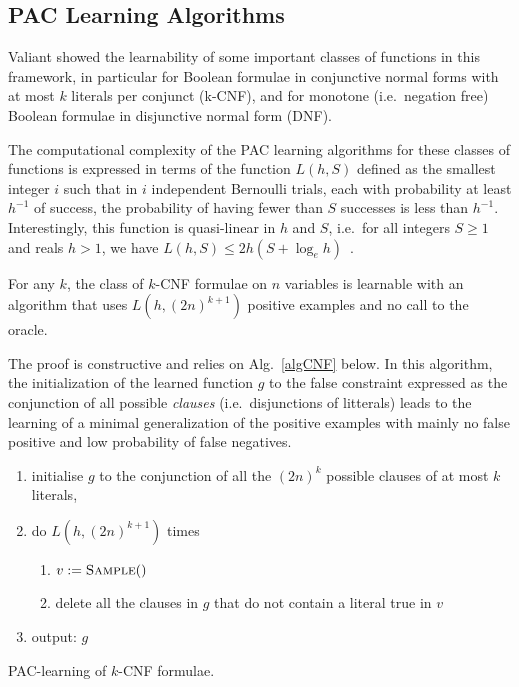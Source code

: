 \documentclass{llncs}
\begin{document}
\subsection{PAC Learning Algorithms}

Valiant showed the learnability of some important classes of functions in this framework,
in particular for Boolean formulae in conjunctive normal forms with at most $k$ literals per conjunct (k-CNF),
and for monotone (i.e.~negation free) Boolean formulae in disjunctive normal form (DNF).

The computational complexity of the PAC learning algorithms for these classes of functions is expressed in terms of the function
$L(h,S)$ defined as the smallest integer $i$ such that
in $i$ independent Bernoulli trials, each with probability at least $h^{-1}$ of success, the probability of having fewer than $S$ successes is less than $h^{-1}$.
Interestingly, this function is quasi-linear in $h$ and $S$, i.e.~for all
integers $S\ge 1$ and reals $h>1$, we have $L(h,S) \le 2h(S+\log_e h)$~\cite{Valiant84cacm}.

\begin{theorem}\label{thm:kcnf}
For any $k$, the class of $k$-CNF formulae on $n$ variables is learnable with an
algorithm that uses $L(h,{(2 n)}^{k+1})$ positive examples and no call to the
oracle.
\end{theorem}

The proof is constructive and relies on Alg.~\ref{algCNF} below. In this algorithm, the initialization of the learned function $g$ to the false constraint expressed as the conjunction of all possible \emph{clauses} (i.e.~disjunctions of litterals)
leads to the learning of a minimal generalization of the positive examples with mainly no false positive and low probability of false negatives.

\begin{algorithm}
\begin{enumerate}
  \item initialise $g$ to the conjunction of all the $(2n)^k$ possible clauses of at most $k$ literals,
\item do $L(h,(2n)^{k+1})$ times 
\begin{enumerate}
\item $v:=\textsc{Sample}()$
\item delete all the clauses in $g$ that do not contain a literal true in $v$
\end{enumerate}
\item output: $g$
\end{enumerate}
\caption{PAC-learning of $k$-CNF formulae.\label{algCNF}}
\end{algorithm}
\end{document}
